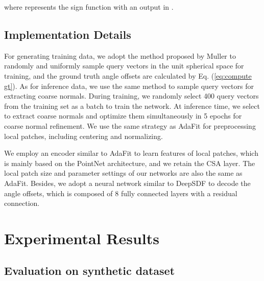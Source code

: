 \documentclass[letterpaper]{article} \usepackage{aaai23}  \usepackage{times}  \usepackage{helvet}  \usepackage{courier}  \usepackage[hyphens]{url}  \usepackage{graphicx} \urlstyle{rm} \def\UrlFont{\rm}  \usepackage{natbib}  \usepackage{caption} \frenchspacing  \setlength{\pdfpagewidth}{8.5in} \setlength{\pdfpageheight}{11in} \usepackage{algorithm}
\begin{document}
where  represents the sign function with an output in .


\subsection{Implementation Details}
For generating training data, we adopt the method proposed by Muller  to randomly and uniformly sample  query vectors in the unit spherical space for training, and the ground truth angle offsets are calculated by Eq. (\ref{eq:compute gt}). As for inference data, we use the same method to sample  query vectors for extracting coarse normals. During training, we randomly select 400 query vectors from the training set as a batch to train the network. At inference time, we select to extract  coarse normals and optimize them simultaneously in 5 epochs for coarse normal refinement. We use the same strategy as AdaFit \cite{RunsongZhu2021AdaFitRL} for preprocessing local patches, including centering and normalizing.

We employ an encoder similar to AdaFit to learn features of local patches, which is mainly based on the PointNet  \cite{CharlesRQi2016PointNetDL} architecture, and we retain the CSA layer. The local patch size and parameter settings of our networks are also the same as AdaFit. Besides, we adopt a neural network similar to DeepSDF \cite{JeongJoonPark2019DeepSDFLC} to decode the angle offsets, which is composed of 8 fully connected layers with a residual connection.

\section{Experimental Results}

\subsection{Evaluation on synthetic dataset}
\end{document}

